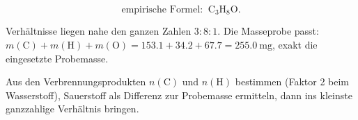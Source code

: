 \begin{ergebnis}
\begin{equation}
  \text{empirische Formel: }\ \mathrm{C_3H_8O}.
\end{equation}
\end{ergebnis}

\begin{kontrolle}
Verhältnisse liegen nahe den ganzen Zahlen $3:8:1$. Die Masseprobe passt:
$m(\mathrm{C}) + m(\mathrm{H}) + m(\mathrm{O}) = 153.1 + 34.2 + 67.7 =
255.0\ \mathrm{mg}$, exakt die eingesetzte Probemasse.
\end{kontrolle}

\begin{merksatz}
Aus den Verbrennungsprodukten $n(\mathrm{C})$ und $n(\mathrm{H})$ bestimmen
(Faktor 2 beim Wasserstoff), Sauerstoff als Differenz zur Probemasse ermitteln,
dann ins kleinste ganzzahlige Verhältnis bringen.
\end{merksatz}
